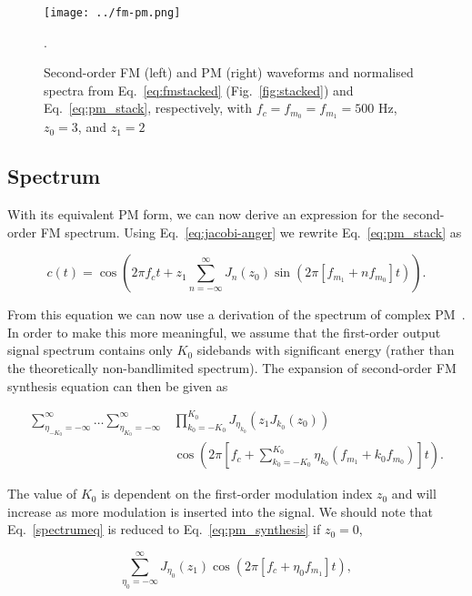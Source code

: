 \documentclass[]{interact}
\begin{document}
\begin{figure}[htp]
\begin{center}
\texttt{[image: ../fm-pm.png]}
\caption{Second-order FM (left) and PM (right) waveforms and normalised spectra from Eq.~\ref{eq:fmstacked} (Fig.~\ref{fig:stacked}) and Eq.~\ref{eq:pm_stack}, respectively, with $f_c = f_{m_0} = f_{m_1} = 500$ Hz, $z_0=3$, and $z_1=2$}.
\label{fig:fm-pm}
\end{center}
\end{figure} 

\subsection{Spectrum}

With its equivalent PM form, we can now derive an expression for the second-order FM spectrum. Using
Eq.~\ref{eq:jacobi-anger} we rewrite Eq.~\ref{eq:pm_stack} as

\begin{equation}
c(t) =  \cos\left( 2\pi f_c t + z_1 \sum_{n=-\infty}^{\infty} J_n(z_0)\sin\left(2\pi [f_{m_1}  + n f_{m_0}] t\right)\right).
\end{equation}

From this equation we can now use a derivation of the spectrum of complex PM~\citep{LeBrunFM}. In order to make this 
more meaningful, we assume that the first-order output signal spectrum contains only $K_0$ sidebands 
with significant energy (rather than the theoretically non-bandlimited spectrum). The expansion of
second-order FM synthesis equation can then be given as 

\begin{equation}\label{spectrumeq}
\begin{split}
\sum_{\eta_{-K_0}=-\infty}^{\infty} \ldots \sum_{\eta_{K_0}=-\infty}^{\infty}
&\prod_{k_0=-K_0}^{K_0} J_{\eta_{k_0}}\left(z_1 J_{k_0}(z_0)\right)\\
&\cos\left(2 \pi [f_c  + \sum_{k_0=-K_0}^{K_0} \eta_{k_0}(f_{m_1} + k_0 f_{m_0})] t \right).
\end{split}
\end{equation}

The value of $K_0$ is dependent on the first-order modulation index $z_0$ and will increase as more
modulation is inserted into the signal. We should note that Eq.~\ref{spectrumeq} is reduced to Eq.~\ref{eq:pm_synthesis} if $z_0 = 0$,

\begin{equation}
\sum_{\eta_0=-\infty}^{\infty} J_{\eta_0}\left(z_1\right) \cos\left(2 \pi [f_c  + \eta_0 f_{m_1}] t \right),
\end{equation}
\end{document}
